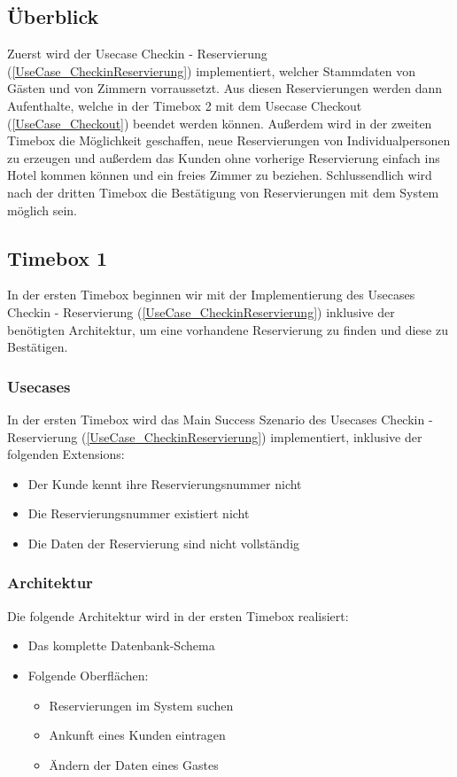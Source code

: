 \subsection{Überblick}
Zuerst wird der Usecase Checkin - Reservierung (\ref{UseCase_CheckinReservierung}) implementiert, welcher Stammdaten von Gästen und von Zimmern vorraussetzt.
Aus diesen Reservierungen werden dann Aufenthalte, welche in der Timebox 2 mit dem Usecase Checkout (\ref{UseCase_Checkout}) beendet werden können.
Außerdem wird in der zweiten Timebox die Möglichkeit geschaffen, neue \Gls{Reservierung}en von Individualpersonen zu erzeugen und außerdem
das Kunden ohne vorherige \Gls{Reservierung} einfach ins Hotel kommen können und ein freies Zimmer zu beziehen.
Schlussendlich wird nach der dritten Timebox die Bestätigung von Reservierungen mit dem System möglich sein.

\subsection{Timebox 1}
In der ersten Timebox beginnen wir mit der Implementierung des Usecases Checkin - Reservierung (\ref{UseCase_CheckinReservierung}) inklusive der benötigten Architektur,
um eine vorhandene Reservierung zu finden und diese zu Bestätigen.

\subsubsection{Usecases}
In der ersten Timebox wird das Main Success Szenario des Usecases Checkin - Reservierung (\ref{UseCase_CheckinReservierung}) implementiert,
inklusive der folgenden Extensions:

\begin{itemize}
	\item Der \Gls{Kunde} kennt ihre \Gls{Reservierungsnummer} nicht
	\item Die \Gls{Reservierungsnummer} existiert nicht
	\item Die Daten der \Gls{Reservierung} sind nicht vollständig
\end{itemize}
\subsubsection{Architektur}
Die folgende Architektur wird in der ersten Timebox realisiert:

\begin{itemize}
	\item Das komplette Datenbank-Schema
	\item Folgende Oberflächen:
	\begin{itemize}
		\item Reservierungen im System suchen
		\item Ankunft eines \Gls{Kunde}n eintragen
		\item Ändern der Daten eines \Gls{Gast}es
	\end{itemize}
\end{itemize}
